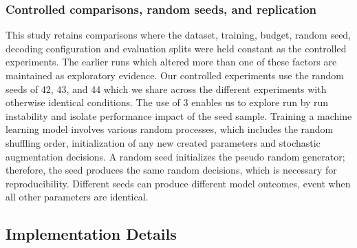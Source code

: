 {\subsubsection{Controlled comparisons, random seeds, and replication}
\label{sec:seeds}

This study retains comparisons where the dataset, training, budget, random seed, decoding configuration and evaluation splits were held constant as the controlled experiments. The earlier runs which altered more than one of these factors are maintained as exploratory evidence. Our controlled experiments use the random seeds of 42, 43, and 44 which we share across the different experiments with otherwise identical conditions. The use of 3 enables us to explore run by run instability and isolate performance impact of the seed sample. Training a machine learning model involves various random processes, which includes the random shuffling order, initialization of any new created parameters and stochastic augmentation decisions. A random seed initializes the pseudo random generator; therefore, the seed produces the same random decisions, which is necessary for reproducibility. Different seeds can produce different model outcomes, event when all other parameters are identical\citep{Reimers2017, Dodge2020}.

\subsection{Implementation Details}

}
